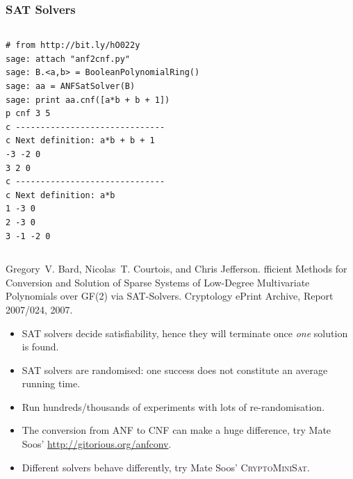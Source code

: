 \documentclass[9pt]{beamer}
\begin{document}
\begin{frame}
\frametitle{SAT Solvers} 
\begin{columns}
\begin{lstlisting}
# from http://bit.ly/hO022y
sage: attach "anf2cnf.py" 
sage: B.<a,b> = BooleanPolynomialRing()
sage: aa = ANFSatSolver(B)
sage: print aa.cnf([a*b + b + 1])
p cnf 3 5
c ------------------------------
c Next definition: a*b + b + 1
-3 -2 0
3 2 0
c ------------------------------
c Next definition: a*b
1 -3 0
2 -3 0
3 -1 -2 0
\end{lstlisting}


\begin{algorithm}[H]
\end{algorithm}
\end{columns}

\begin{small}
\begin{thebibliography}{Bard2007a}
Gregory~V. Bard, Nicolas~T. Courtois, and Chris Jefferson.
fficient {M}ethods for {C}onversion and {S}olution of {S}parse
  {S}ystems of {L}ow-{D}egree {M}ultivariate {P}olynomials over {GF(2)} via
  {SAT}-{S}olvers.
\newblock Cryptology ePrint Archive, Report 2007/024, 2007.
 \end{thebibliography}
\end{small}

\framebreak

\begin{itemize}
 \item SAT solvers decide satisfiability, hence they will terminate once \emph{one} solution is found.
 \item SAT solvers are randomised: one success does not constitute an average running time.
 \item Run hundreds/thousands of experiments with lots of re-randomisation.
 \item The conversion from ANF to CNF can make a huge difference, try Mate Soos' \url{http://gitorious.org/anfconv}.
 \item Different solvers behave differently, try Mate Soos' \textsc{CryptoMiniSat}.
\end{itemize}


\end{frame}
\end{document}
